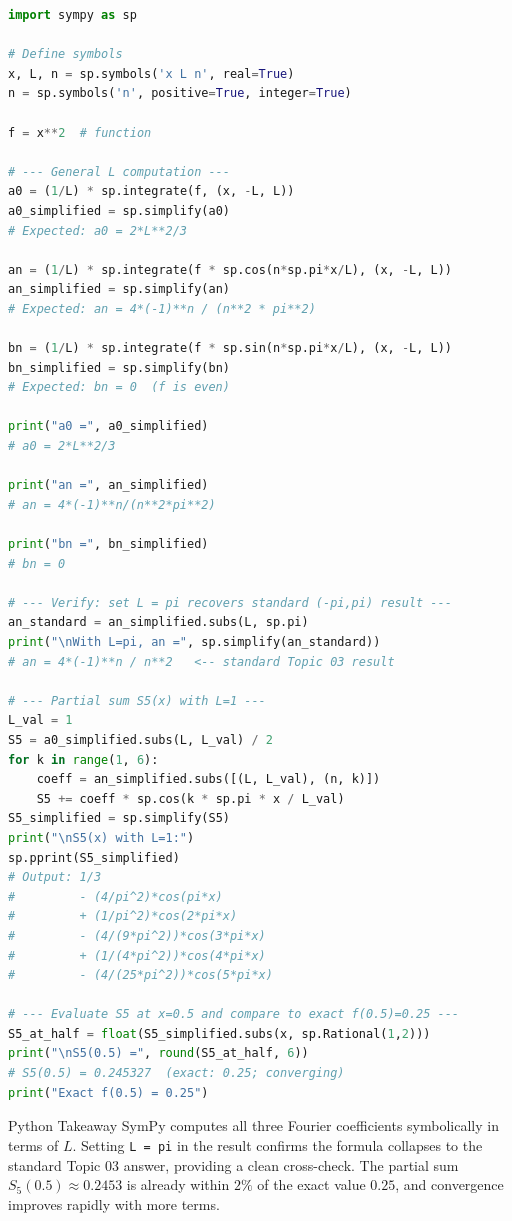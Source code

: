 \documentclass[12pt,a4paper]{article}
\begin{document}
\begin{lstlisting}[language=Python, caption={Fourier series of $f(x)=x^2$ on $(-L,L)$ using SymPy}]
import sympy as sp

# Define symbols
x, L, n = sp.symbols('x L n', real=True)
n = sp.symbols('n', positive=True, integer=True)

f = x**2  # function

# --- General L computation ---
a0 = (1/L) * sp.integrate(f, (x, -L, L))
a0_simplified = sp.simplify(a0)
# Expected: a0 = 2*L**2/3

an = (1/L) * sp.integrate(f * sp.cos(n*sp.pi*x/L), (x, -L, L))
an_simplified = sp.simplify(an)
# Expected: an = 4*(-1)**n / (n**2 * pi**2)

bn = (1/L) * sp.integrate(f * sp.sin(n*sp.pi*x/L), (x, -L, L))
bn_simplified = sp.simplify(bn)
# Expected: bn = 0  (f is even)

print("a0 =", a0_simplified)
# a0 = 2*L**2/3

print("an =", an_simplified)
# an = 4*(-1)**n/(n**2*pi**2)

print("bn =", bn_simplified)
# bn = 0

# --- Verify: set L = pi recovers standard (-pi,pi) result ---
an_standard = an_simplified.subs(L, sp.pi)
print("\nWith L=pi, an =", sp.simplify(an_standard))
# an = 4*(-1)**n / n**2   <-- standard Topic 03 result

# --- Partial sum S5(x) with L=1 ---
L_val = 1
S5 = a0_simplified.subs(L, L_val) / 2
for k in range(1, 6):
    coeff = an_simplified.subs([(L, L_val), (n, k)])
    S5 += coeff * sp.cos(k * sp.pi * x / L_val)
S5_simplified = sp.simplify(S5)
print("\nS5(x) with L=1:")
sp.pprint(S5_simplified)
# Output: 1/3
#         - (4/pi^2)*cos(pi*x)
#         + (1/pi^2)*cos(2*pi*x)
#         - (4/(9*pi^2))*cos(3*pi*x)
#         + (1/(4*pi^2))*cos(4*pi*x)
#         - (4/(25*pi^2))*cos(5*pi*x)

# --- Evaluate S5 at x=0.5 and compare to exact f(0.5)=0.25 ---
S5_at_half = float(S5_simplified.subs(x, sp.Rational(1,2)))
print("\nS5(0.5) =", round(S5_at_half, 6))
# S5(0.5) = 0.245327  (exact: 0.25; converging)
print("Exact f(0.5) = 0.25")
\end{lstlisting}

\begin{learnbox}{Python Takeaway}
SymPy computes all three Fourier coefficients symbolically in terms of $L$.
Setting \texttt{L = pi} in the result confirms the formula collapses to the standard Topic 03 answer, providing a clean cross-check.
The partial sum $S_5(0.5) \approx 0.2453$ is already within $2\%$ of the exact value $0.25$, and convergence improves rapidly with more terms.
\end{learnbox}
\end{document}
